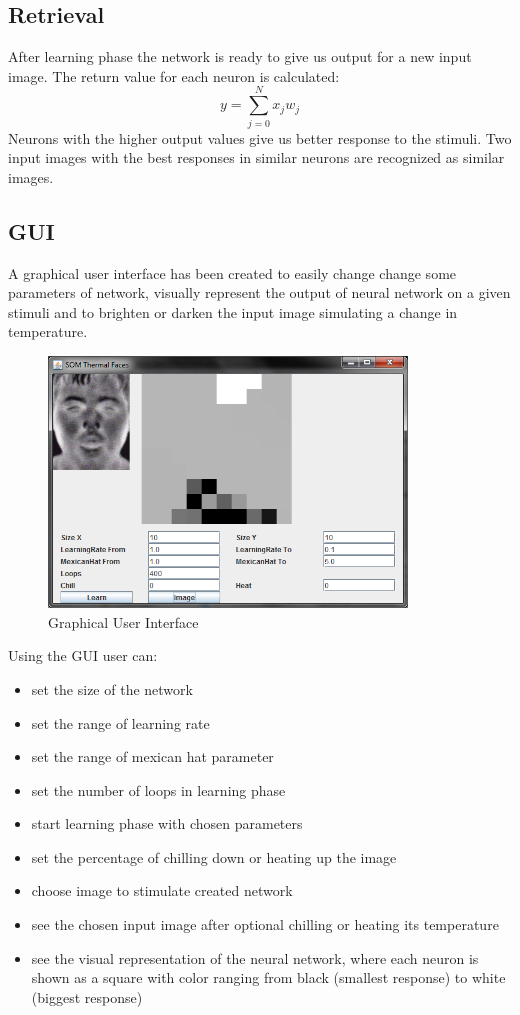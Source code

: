 \documentclass[pdftex]{article}
\begin{document}
\subsection{Retrieval}
After learning phase the network is ready to give us output for a new input image. The return value for each neuron is calculated:
$$ y=\sum_{j=0}^{N}x_jw_j $$
Neurons with the higher output values give us better response to the stimuli. Two input images with the best responses in similar neurons are recognized as similar images.
\subsection{GUI}
A graphical user interface has been created to easily change change some parameters of network, visually represent the output of neural network on a given stimuli and to brighten or darken the input image simulating a change in temperature.
\begin{figure}[!htb]
	\centering
	\includegraphics[width=0.85\textwidth]{pictures/gui.png} 
	\caption{Graphical User Interface}
\end{figure}
Using the GUI user can:
\begin{itemize}
\item{set the size of the network}
\item{set the range of learning rate}
\item{set the range of mexican hat parameter}
\item{set the number of loops in learning phase}
\item{start learning phase with chosen parameters}
\item{set the percentage of chilling down or heating up the image}
\item{choose image to stimulate created network}
\item{see the chosen input image after optional chilling or heating its temperature}
\item{see the visual representation of the neural network, where each neuron is shown as a square with color ranging from black (smallest response) to white (biggest response)}
\end{itemize}
\end{document}
